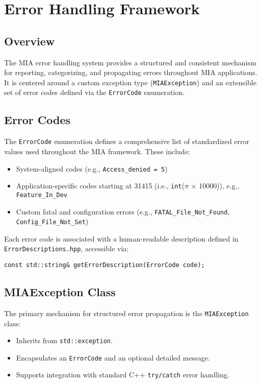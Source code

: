 \section{Error Handling Framework}
\label{sec:error-handling}

\subsection*{Overview}
The MIA error handling system provides a structured and consistent mechanism for reporting, categorizing, and propagating errors throughout MIA applications. It is centered around a custom exception type (\texttt{MIAException}) and an extensible set of error codes defined via the \texttt{ErrorCode} enumeration.

\subsection*{Error Codes}
The \texttt{ErrorCode} enumeration defines a comprehensive list of standardized error values used throughout the MIA framework. These include:
\begin{itemize}
	\item System-aligned codes (e.g., \texttt{Access\_denied = 5})
	\item Application-specific codes starting at 31415 (i.e., \texttt{int}($\pi$ × 10000)), e.g., \texttt{Feature\_In\_Dev}
	\item Custom fatal and configuration errors (e.g., \texttt{FATAL\_File\_Not\_Found}, \texttt{Config\_File\_Not\_Set})
\end{itemize}

Each error code is associated with a human-readable description defined in \texttt{ErrorDescriptions.hpp}, accessible via:
\begin{lstlisting}[style=cppstyle]
const std::string& getErrorDescription(ErrorCode code);
\end{lstlisting}

\subsection*{MIAException Class}
The primary mechanism for structured error propagation is the \texttt{MIAException} class:
\begin{itemize}
	\item Inherits from \texttt{std::exception}.
	\item Encapsulates an \texttt{ErrorCode} and an optional detailed message.
	\item Supports integration with standard C++ \texttt{try/catch} error handling.
\end{itemize}


